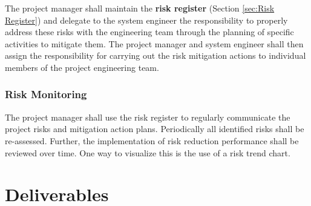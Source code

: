 The project manager shall maintain the \textbf{risk register} (Section \ref{sec:Risk Register}) and delegate to the system engineer the responsibility to properly address these risks with the engineering team through the planning of specific activities to mitigate them. The project manager and system engineer shall then assign the responsibility for carrying out the risk mitigation actions to individual members of the project engineering team.
 
\subsubsection{Risk Monitoring}

The project manager shall use the risk register to regularly communicate the project risks and mitigation action plans. Periodically all identified risks shall be re-assessed. Further, the implementation of risk reduction performance shall be reviewed over time. One way to visualize this is the use of a risk trend chart. 
  
\clearpage
\section{Deliverables}
\label{sec:Project Management Deliverables}


